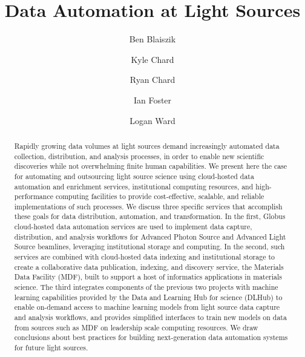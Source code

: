 \documentclass{aip-cp}
\begin{document}
\title{Data Automation at Light Sources}

\author[aff1]{Ben Blaiszik}
\author[aff1]{Kyle Chard}
\author[aff1]{Ryan Chard}
\author[aff1,aff2]{Ian Foster}
\author[aff1]{Logan Ward}


\maketitle


\begin{abstract}
Rapidly growing data volumes at light sources demand increasingly automated data collection, 
distribution, and analysis processes, in order to enable new scientific discoveries while not 
overwhelming finite human capabilities. We present here the case for automating and outsourcing 
light source science using cloud-hosted data automation and enrichment services, institutional 
computing resources, and high- performance computing facilities to provide cost-effective, scalable, 
and reliable implementations of such processes. We discuss three specific services that accomplish 
these goals for data distribution, automation, and transformation. In the first, 
Globus cloud-hosted data automation services are used to implement data capture, distribution, and 
analysis workflows for Advanced Photon Source and Advanced Light Source beamlines, leveraging 
institutional storage and computing. 
In the second, such services are 
combined with cloud-hosted data indexing and institutional storage to create a 
collaborative data publication, indexing, and discovery service, the Materials Data Facility (MDF), 
built to support a host of informatics applications in materials science.  
The third integrates 
components of the previous two projects with machine learning capabilities provided by the Data and 
Learning Hub for science (DLHub) to enable on-demand access to machine learning models from light 
source data capture and analysis workflows, and provides simplified interfaces to train new models 
on data from sources such as MDF on leadership scale computing resources. We draw conclusions about 
best practices for building next-generation data automation systems for future light sources.
\end{abstract}
\end{document}
